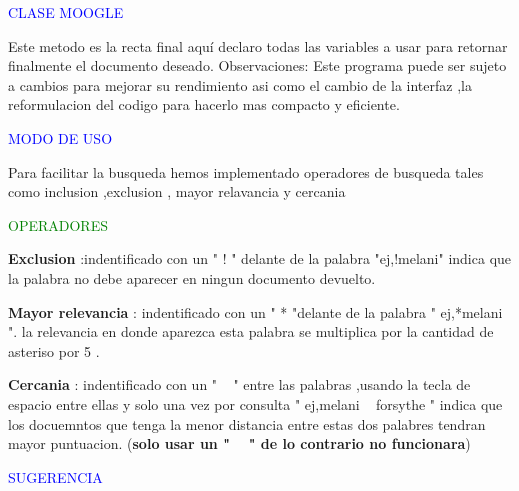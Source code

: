 \documentclass{article}
\begin{document}
\vspace{0.5cm}

\large \textcolor {blue} {CLASE MOOGLE}

\vspace{0.2cm}

Este metodo es la recta final aquí declaro todas las variables a usar para retornar finalmente el documento deseado.
Observaciones: Este programa puede ser sujeto a cambios para mejorar su rendimiento asi como el cambio de la interfaz ,la reformulacion del codigo para hacerlo mas compacto y eficiente.

\vspace{1.0 cm }

\large \textcolor {blue}{MODO DE USO} 

\vspace{0.5cm}

Para facilitar la busqueda hemos implementado operadores de busqueda tales como inclusion ,exclusion , mayor relavancia y cercania 

\textcolor {green} {OPERADORES}
\vspace{0.2cm}

\textbf {Exclusion} :indentificado con un " ! " delante de la palabra "ej,!melani" indica que la palabra no debe aparecer en ningun documento devuelto.

\vspace{0.2cm}

\textbf {Mayor relevancia }: indentificado con un " * "delante de la palabra " ej,*melani ". la relevancia en donde aparezca esta palabra se multiplica por la cantidad de asteriso por 5 .

\vspace{0.2cm}

\textbf {Cercania} : indentificado con un " ~ " entre las palabras ,usando la tecla de espacio entre ellas y solo una vez por consulta " ej,melani ~ forsythe " indica que los docuemntos que tenga la menor distancia entre estas dos palabres tendran mayor puntuacion. (\textbf{solo usar un " ~ " de lo contrario no funcionara})

\vspace{0.5cm}

\Large \textcolor {blue} {SUGERENCIA}

\vspace{0.5cm}
\end{document}
